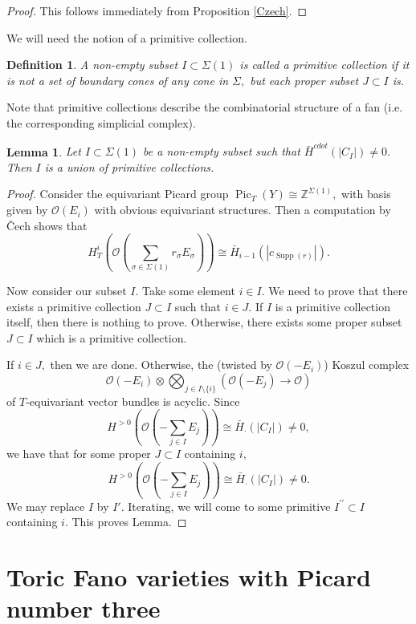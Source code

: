 \documentclass[11pt,leqno]{amsart}
\newtheorem{lemma}[theo]{Lemma}
\newtheorem{defi}[theo]{Definition}
\numberwithin{equation}{section}
\def\Z{\mathbb{Z}}
\newcommand{\cO}{{\mathcal O}}
\newcommand{\supp}{\operatorname{Supp}}
\newcommand{\Pic}{\operatorname{Pic}}
\begin{document}
\begin{proof}This follows immediately from Proposition \ref{Czech}.\end{proof}

We will need the notion of a primitive collection.

\begin{defi}A non-empty subset $I\subset \Sigma(1)$ is called a primitive collection if
it is not a set of boundary cones of any cone in $\Sigma,$ but each proper subset $J\subset I$ is.\end{defi}

Note that primitive collections describe the combinatorial structure of a fan (i.e. the corresponding simplicial complex).

\begin{lemma}\label{union}Let $I\subset\Sigma(1)$ be a non-empty subset such that $\bar{H}^{cdot}(|C_I|)\ne 0.$
Then $I$ is a union of primitive collections.\end{lemma}

\begin{proof}Consider the equivariant Picard group $\Pic_T(Y)\cong \Z^{\Sigma(1)},$ with basis given by $\cO(E_i)$ with obvious equivariant structures.
Then a computation by \v{C}ech shows that
$$H^i_T(\cO(\sum\limits_{\sigma\in\Sigma(1)}r_{\sigma}E_{\sigma}))\cong \bar{H}_{i-1}(|c_{\supp(r)}|).$$

Now consider our subset $I.$ Take some element $i\in I.$ We need to prove that there exists a primitive collection $J\subset I$ such that $i\in J.$
If $I$ is a primitive collection itself, then there is nothing to prove. Otherwise,
there exists some proper subset $J\subset I$ which is a primitive collection.

If $i\in J,$ then we are done. Otherwise,
the (twisted by $\cO(-E_i)$) Koszul complex
$$\cO(-E_i)\otimes \bigotimes_{j\in I\setminus\{i\}}(\cO(-E_j)\to\cO)$$
of $T$-equivariant vector bundles is acyclic. Since
$$H^{>0}(\cO(-\sum\limits_{j\in I}E_j))\cong \bar{H}_{\cdot}(|C_I|)\ne 0,$$
we have that for some proper $J\subset I$ containing $i,$
$$H^{>0}(\cO(-\sum\limits_{j\in I}E_j))\cong \bar{H}_{\cdot}(|C_I|)\ne 0.$$
We may replace $I$ by $I'.$ Iterating, we will come to some primitive $I^{\prime\prime}\subset I$ containing $i.$ This proves Lemma.\end{proof}

\section{Toric Fano varieties with Picard number three}
\label{var_pic_three}
\end{document}
